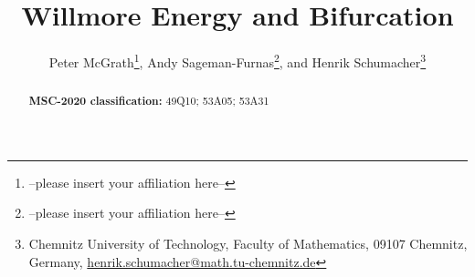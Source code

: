 \documentclass[
	final%
	,12pt%
	,pagesize%
	,headings=normal%
	,paper=a4%
	,parskip=false%
	,headsepline=true%
	,abstract=true%
]{scrartcl}
\title{Willmore Energy and Bifurcation}
\author{
{Peter McGrath\thanks{--please insert your affiliation here--}},
{Andy Sageman-Furnas\thanks{--please insert your affiliation here--}},
{} and {}
{Henrik Schumacher\thanks{Chemnitz University of Technology,
Faculty of Mathematics, 09107 Chemnitz, Germany, \href{mailto:henrik.schumacher@math.tu-chemnitz.de
}{henrik.schumacher@math.tu-chemnitz.de}}}
}
\begin{document}
\maketitle

\begin{abstract}
\begin{small}


\noindent
\textbf{MSC-2020 classification:} 
  49Q10; %
  53A05; %
  53A31  %
\end{small}
\end{abstract}









%



%

%


%
%

%
\begin{small}
\setlength{\parskip}{0.5ex}

\end{small}
\end{document}
